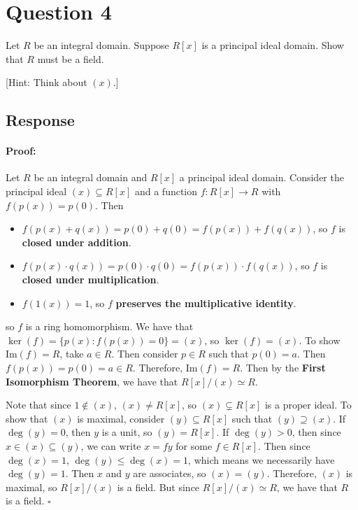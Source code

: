 \documentclass [12pt] {article}
\newenvironment{proof}{\paragraph{Proof:}}{\hfill$\square$}
\begin{document}
\section*{Question 4}
Let $R$ be an integral domain. Suppose $R[x]$ is a principal ideal domain. Show that $R$ must be a
field.

[Hint: Think about $(x)$.]
\subsection*{Response}
\begin{proof}
    Let $R$ be an integral domain and $R[x]$ a principal ideal domain. Consider the principal ideal
    $(x) \subseteq R[x]$ and a function $f : R[x] \to R$ with $f(p(x)) = p(0)$. Then
    \begin{itemize}
        \item $f(p(x) + q(x)) = p(0) + q(0) = f(p(x)) + f(q(x))$, so $f$ is
            \textbf{closed under addition}.
        \item $f(p(x) \cdot q(x)) = p(0) \cdot q(0) = f(p(x)) \cdot f(q(x))$, so $f$ is
            \textbf{closed under multiplication}.
        \item $f(1(x)) = 1$, so $f$ \textbf{preserves the multiplicative identity}.
    \end{itemize}
    so $f$ is a ring homomorphism. We have that $\ker(f) = \{ p(x) : f(p(x)) = 0 \} = (x)$, so
    $\ker(f) = (x)$. To show $\text{Im}(f) = R$, take $a \in R$. Then consider
    $p \in R$ such that $p(0) = a$. Then $f(p(x)) = p(0) = a \in R$. Therefore,
    $\text{Im}(f) = R$. Then by the \textbf{First Isomorphism Theorem}, we have that
    $R[x]/(x) \simeq R$.
    \vspace{0.5em}

    Note that since $1 \not \in (x)$, $(x) \neq R[x]$, so $(x) \subsetneq R[x]$ is a proper ideal.
    To show that $(x)$ is maximal, consider $(y) \subseteq R[x]$ such that $(y) \supseteq (x)$.
    If $\deg(y) = 0$, then $y$ is a unit, so $(y) = R[x]$. If $\deg(y) > 0$, then since
    $x \in (x) \subseteq (y)$, we can write $x = fy$ for some $f \in R[x]$. Then since
    $\deg(x) = 1$, $\deg(y) \leq \deg(x) = 1$, which means we necessarily have $\deg(y) = 1$. Then
    $x$ and $y$ are associates, so $(x) = (y)$. Therefore, $(x)$ is maximal, so $R[x]/(x)$ is a
    field. But since $R[x]/(x) \simeq R$, we have that $R$ is a field.
\end{proof}
\end{document}
